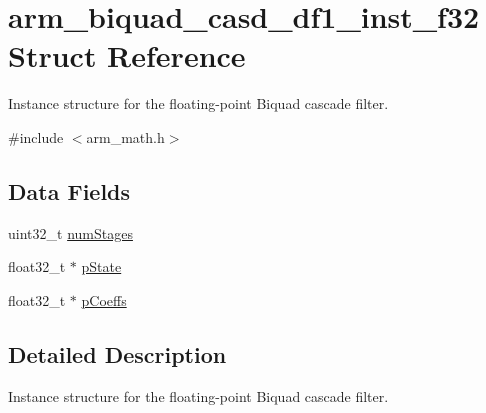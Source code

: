 \hypertarget{structarm__biquad__casd__df1__inst__f32}{\section{arm\-\_\-biquad\-\_\-casd\-\_\-df1\-\_\-inst\-\_\-f32 Struct Reference}
\label{structarm__biquad__casd__df1__inst__f32}
}


Instance structure for the floating-\/point Biquad cascade filter.  




{\ttfamily \#include $<$arm\-\_\-math.\-h$>$}

\subsection*{Data Fields}
\begin{DoxyCompactItemize}
\item 
uint32\-\_\-t \hyperlink{structarm__biquad__casd__df1__inst__f32_aed9c8a6224cd149e8e12b17b25b9b767}{num\-Stages}
\item 
float32\-\_\-t $\ast$ \hyperlink{structarm__biquad__casd__df1__inst__f32_a335c87e6fdc4b96601d95a5de8b9c463}{p\-State}
\item 
float32\-\_\-t $\ast$ \hyperlink{structarm__biquad__casd__df1__inst__f32_aacbb8dd8eeba4b21fc2bb40076405ee3}{p\-Coeffs}
\end{DoxyCompactItemize}


\subsection{Detailed Description}
Instance structure for the floating-\/point Biquad cascade filter. 

